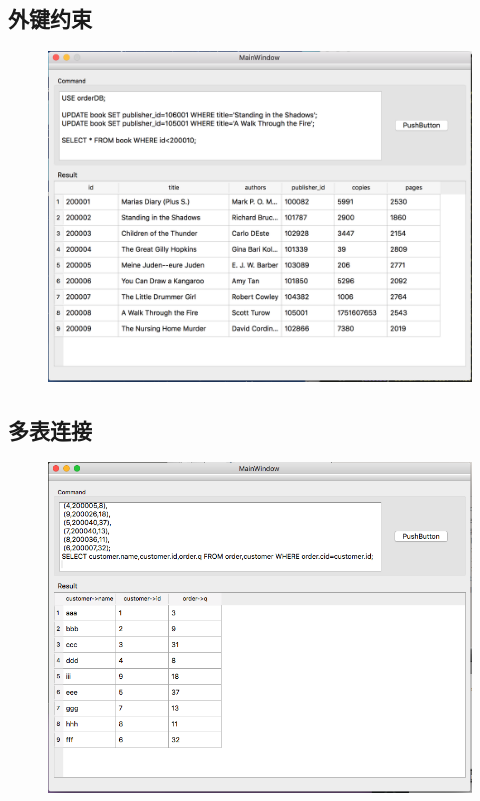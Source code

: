\subsection{外键约束}
\begin{figure}[H]
\centering
\includegraphics[width=4.75in]{Figures/screen_shot/outkey.png}
\end{figure}

\subsection{多表连接}
\begin{figure}[H]
\centering
\includegraphics[width=4.75in]{Figures/screen_shot/join.png}
\end{figure}

